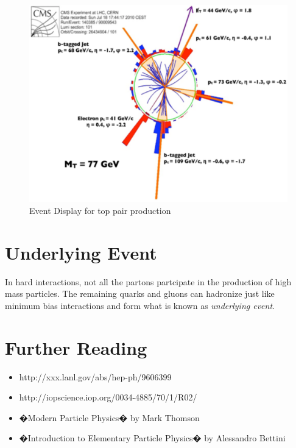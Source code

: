 \begin{figure}[h]
\centering\includegraphics[scale=0.5]{./protonprotoncollisions/Pictures/fig13.pdf}
\caption{Event Display for top pair production}
\label{fig:topdisk}
\end{figure}

\section{ Underlying Event}

In hard interactions, not all the partons partcipate in the production of high mass particles. The remaining quarks and gluons can hadronize just like minimum bias interactions and form what is known as {\it underlying event}. 


\section{ Further Reading}

\begin{itemize}
\item http://xxx.lanl.gov/abs/hep-ph/9606399
\item http://iopscience.iop.org/0034-4885/70/1/R02/
\item �Modern Particle Physics� by Mark Thomson
\item �Introduction to Elementary Particle Physics� by Alessandro Bettini
\end{itemize}
